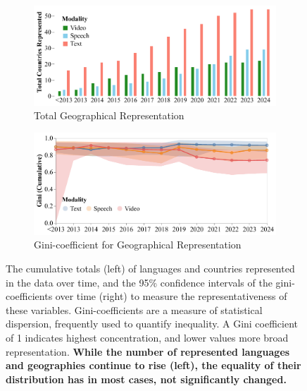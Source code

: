 \begin{figure}[htbp]
    \begin{subfigure}[b]{0.49\textwidth}
        \centering
        \includegraphics[width=\linewidth]{figures/temporal-cumulative-geo.pdf} 
        \caption{Total Geographical Representation}
    \end{subfigure}
    \hfill
    \begin{subfigure}[b]{0.49\textwidth}
        \centering
        \includegraphics[width=\linewidth]{figures/temporal-geo-gini.pdf} 
        \caption{Gini-coefficient for Geographical Representation}
    \end{subfigure}
    
    \caption{The cumulative totals (left) of languages and countries represented in the data over time, and the 95\% confidence intervals of the gini-coefficients over time (right) to measure the representativeness of these variables. Gini-coefficients are a measure of statistical dispersion, frequently used to quantify inequality. 
    A Gini coefficient of 1 indicates highest concentration, and lower values more broad representation.
    \textbf{While the number of represented languages and geographies continue to rise (left), the equality of their distribution has in most cases, not significantly changed.} 
    }
    \label{fig:representation}
\end{figure}

\vspace{-2mm}
